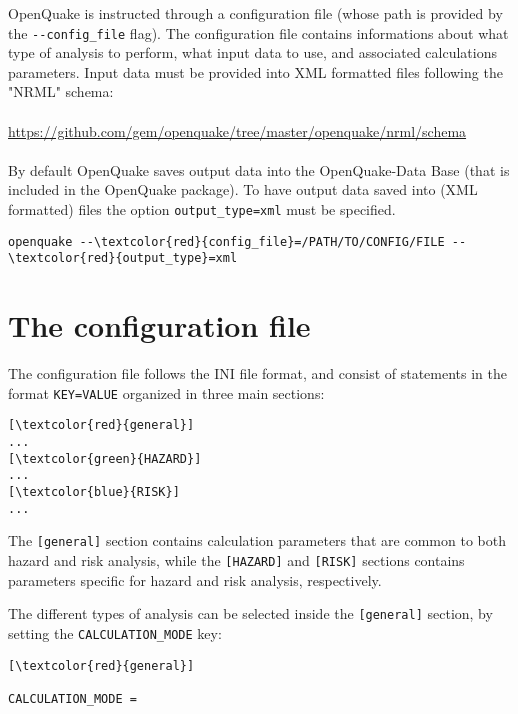 OpenQuake is instructed through a configuration file (whose path is provided by the \Verb+--config_file+ flag). The configuration file contains informations about what type of analysis to perform, what input data to use, and associated calculations parameters. Input data must be provided into XML formatted files following the "NRML" schema: \\ \\
 \href{https://github.com/gem/openquake/tree/master/openquake/nrml/schema}
{https://github.com/gem/openquake/tree/master/openquake/nrml/schema}\\ \\ 
By default OpenQuake saves output data into the OpenQuake-Data Base (that is included in the OpenQuake package). To have output data saved into (XML formatted) files the option \Verb+output_type=xml+ must be specified.
\begin{Verbatim}[frame=single, commandchars=\\\{\}, samepage=true]
openquake --\textcolor{red}{config_file}=/PATH/TO/CONFIG/FILE --\textcolor{red}{output_type}=xml
\end{Verbatim}

\section{The configuration file}
The configuration file follows the INI file format, and consist of statements in the format \Verb+KEY=VALUE+ organized in three main sections:
\begin{Verbatim}[frame=single, commandchars=\\\{\}, samepage=true]
[\textcolor{red}{general}]
...
[\textcolor{green}{HAZARD}]
...
[\textcolor{blue}{RISK}]
...
\end{Verbatim}
 
The \Verb+[general]+ section contains calculation parameters that are common to both hazard and risk analysis, while the \Verb+[HAZARD]+ and \Verb+[RISK]+ sections contains parameters specific for hazard and risk analysis, respectively.

The different types of analysis can be selected inside the \Verb+[general]+ section, by setting  the \Verb+CALCULATION_MODE+ key:
\begin{Verbatim}[frame=single, commandchars=\\\{\}, samepage=true]
[\textcolor{red}{general}]

CALCULATION_MODE =
\end{Verbatim}

